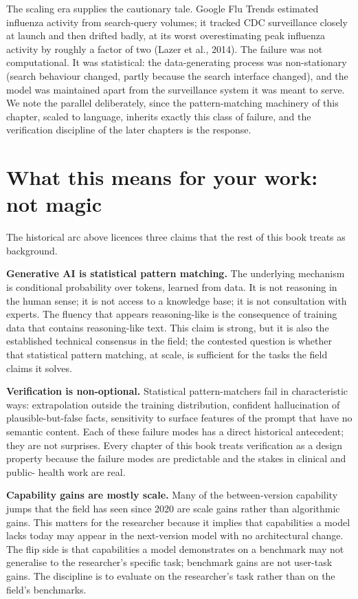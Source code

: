 \documentclass[
  letterpaper,
  11pt]{scrbook}
\begin{document}
The scaling era supplies the cautionary tale. Google Flu Trends
estimated influenza activity from search-query volumes; it tracked CDC
surveillance closely at launch and then drifted badly, at its worst
overestimating peak influenza activity by roughly a factor of two (Lazer
et al., 2014). The failure was not computational. It was statistical:
the data-generating process was non-stationary (search behaviour
changed, partly because the search interface changed), and the model was
maintained apart from the surveillance system it was meant to serve. We
note the parallel deliberately, since the pattern-matching machinery of
this chapter, scaled to language, inherits exactly this class of
failure, and the verification discipline of the later chapters is the
response.

\section{What this means for your work: not
magic}\label{what-this-means-for-your-work-not-magic}

The historical arc above licences three claims that the rest of this
book treats as background.

\textbf{Generative AI is statistical pattern matching.} The underlying
mechanism is conditional probability over tokens, learned from data. It
is not reasoning in the human sense; it is not access to a knowledge
base; it is not consultation with experts. The fluency that appears
reasoning-like is the consequence of training data that contains
reasoning-like text. This claim is strong, but it is also the
established technical consensus in the field; the contested question is
whether that statistical pattern matching, at scale, is sufficient for
the tasks the field claims it solves.

\textbf{Verification is non-optional.} Statistical pattern-matchers fail
in characteristic ways: extrapolation outside the training distribution,
confident hallucination of plausible-but-false facts, sensitivity to
surface features of the prompt that have no semantic content. Each of
these failure modes has a direct historical antecedent; they are not
surprises. Every chapter of this book treats verification as a design
property because the failure modes are predictable and the stakes in
clinical and public- health work are real.

\textbf{Capability gains are mostly scale.} Many of the between-version
capability jumps that the field has seen since 2020 are scale gains
rather than algorithmic gains. This matters for the researcher because
it implies that capabilities a model lacks today may appear in the
next-version model with no architectural change. The flip side is that
capabilities a model demonstrates on a benchmark may not generalise to
the researcher's specific task; benchmark gains are not user-task gains.
The discipline is to evaluate on the researcher's task rather than on
the field's benchmarks.
\end{document}

